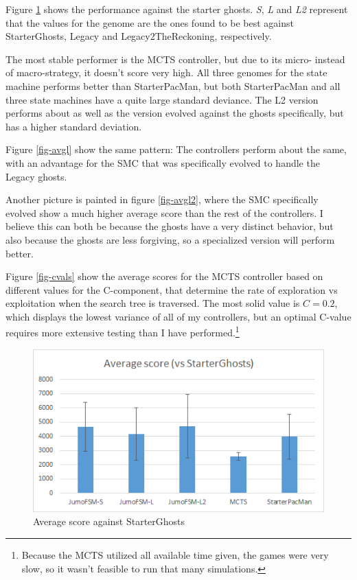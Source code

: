 \documentclass[conference]{IEEEtran}
\begin{document}
Figure \ref{fig-avgs} shows the performance against the starter ghosts. \emph{S}, \emph{L} and \emph{L2} represent that the values for the genome are the ones found to be best against StarterGhosts, Legacy and Legacy2TheReckoning, respectively.

The most stable performer is the MCTS controller, but due to its micro- instead of macro-strategy, it doesn't score very high. All three genomes for the state machine performs better than StarterPacMan, but both StarterPacMan and all three state machines have a quite large standard deviance. The L2 version performs about as well as the version evolved against the ghosts specifically, but has a higher standard deviation.

Figure \ref{fig-avgl} show the same pattern: The controllers perform about the same, with an advantage for the SMC that was specifically evolved to handle the Legacy ghosts.

Another picture is painted in figure \ref{fig-avgl2}, where the SMC specifically evolved show a much higher average score than the rest of the controllers. I believe this can both be because the ghosts have a very distinct behavior, but also because the ghosts are less forgiving, so a specialized version will perform better.

Figure \ref{fig-cvals} show the average scores for the MCTS controller based on different values for the C-component, that determine the rate of exploration vs exploitation when the search tree is traversed. The most solid value is $C = 0.2$, which displays the lowest variance of all of my controllers, but an optimal C-value requires more extensive testing than I have performed.\footnote{Because the MCTS utilized all available time given, the games were very slow, so it wasn't feasible to run that many simulations.}

\begin{figure}[htp]
\centerline{\includegraphics[width=0.9\columnwidth]{average_starter.png}}
\caption{Average score against StarterGhosts}
\label{fig-avgs}
\end{figure}
\end{document}
